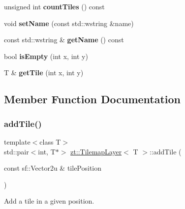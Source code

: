\begin{DoxyCompactItemize}
\mbox{\label{classzt_1_1_tilemap_layer_aaa84d473ece41766d7eab924821b3ed8}} 
unsigned int {\bfseries count\+Tiles} () const
\item 
\mbox{\label{classzt_1_1_tilemap_layer_af8beb5aa8873b00235677aa86d01271e}} 
void {\bfseries set\+Name} (const std\+::wstring \&name)
\item 
\mbox{\label{classzt_1_1_tilemap_layer_a1d892a157ae743bbcd65632dbc10b973}} 
const std\+::wstring \& {\bfseries get\+Name} () const
\item 
\mbox{\label{classzt_1_1_tilemap_layer_a90f1e2ffac9764bf50813a252d4ef859}} 
bool {\bfseries is\+Empty} (int x, int y)
\item 
\mbox{\label{classzt_1_1_tilemap_layer_a7d780310f2514eceb3bfdec5c50913fc}} 
T \& {\bfseries get\+Tile} (int x, int y)
\end{DoxyCompactItemize}


\subsection{Member Function Documentation}
\mbox{\label{classzt_1_1_tilemap_layer_a6fe52aa49bd4965ac7df8a6db0187f5a}} 
\subsubsection{\texorpdfstring{add\+Tile()}{addTile()}}
{\footnotesize\ttfamily template$<$class T$>$ \\
std\+::pair$<$int, T$\ast$$>$ \hyperlink{classzt_1_1_tilemap_layer}{zt\+::\+Tilemap\+Layer}$<$ T $>$\+::add\+Tile (\begin{DoxyParamCaption}\item[{const sf\+::\+Vector2u \&}]{tile\+Position }\end{DoxyParamCaption})\hspace{0.3cm}{\ttfamily [inline]}}



Add a tile in a given position. 


